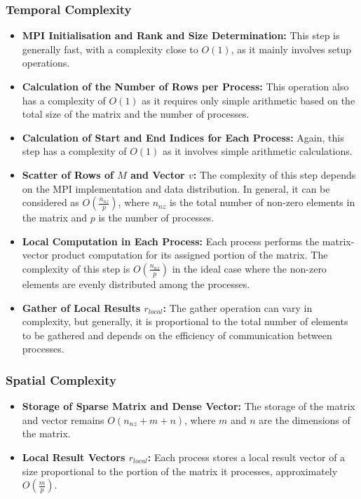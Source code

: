 \documentclass[12pt,oneside]{book} %
\begin{document}
\subsubsection{Temporal Complexity}
\begin{itemize}
    \item \textbf{MPI Initialisation and Rank and Size Determination:} This step is generally fast, with a complexity close to \( O(1) \), as it mainly involves setup operations.
    \item \textbf{Calculation of the Number of Rows per Process:} This operation also has a complexity of \( O(1) \) as it requires only simple arithmetic based on the total size of the matrix and the number of processes.
    \item \textbf{Calculation of Start and End Indices for Each Process:} Again, this step has a complexity of \( O(1) \) as it involves simple arithmetic calculations.
    \item \textbf{Scatter of Rows of \( M \) and Vector \( v \):} The complexity of this step depends on the MPI implementation and data distribution. In general, it can be considered as \( O(\frac{n_{nz}}{p}) \), where \( n_{nz} \) is the total number of non-zero elements in the matrix and \( p \) is the number of processes.
    \item \textbf{Local Computation in Each Process:} Each process performs the matrix-vector product computation for its assigned portion of the matrix. The complexity of this step is \( O(\frac{n_{nz}}{p}) \) in the ideal case where the non-zero elements are evenly distributed among the processes.
    \item \textbf{Gather of Local Results \( r_{local} \):} The gather operation can vary in complexity, but generally, it is proportional to the total number of elements to be gathered and depends on the efficiency of communication between processes.
\end{itemize}

\subsubsection{Spatial Complexity}

\begin{itemize}
    \item \textbf{Storage of Sparse Matrix and Dense Vector:} The storage of the matrix and vector remains \( O(n_{nz} + m + n) \), where \( m \) and \( n \) are the dimensions of the matrix.
    \item \textbf{Local Result Vectors \( r_{local} \):} Each process stores a local result vector of a size proportional to the portion of the matrix it processes, approximately \( O(\frac{m}{p}) \).
\end{itemize}
\end{document}
